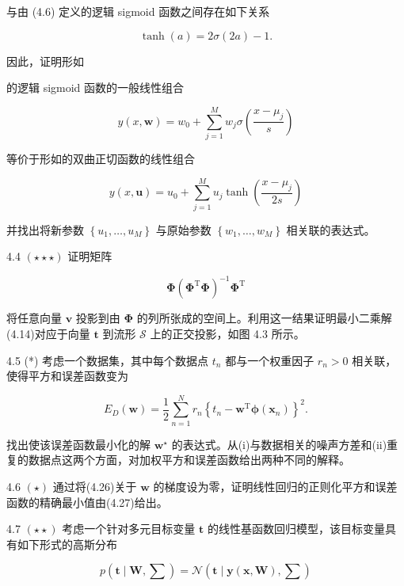 \documentclass[10pt]{article}
\begin{document}
与由 (4.6) 定义的逻辑 sigmoid 函数之间存在如下关系

\[
\tanh \left( a\right)  = {2\sigma }\left( {2a}\right)  - 1. \tag{4.56}
\]

因此，证明形如

的逻辑 sigmoid 函数的一般线性组合

\[
y\left( {x,\mathbf{w}}\right)  = {w}_{0} + \mathop{\sum }\limits_{{j = 1}}^{M}{w}_{j}\sigma \left( \frac{x - {\mu }_{j}}{s}\right)  \tag{4.57}
\]

等价于形如的双曲正切函数的线性组合

\[
y\left( {x,\mathbf{u}}\right)  = {u}_{0} + \mathop{\sum }\limits_{{j = 1}}^{M}{u}_{j}\tanh \left( \frac{x - {\mu }_{j}}{2s}\right)  \tag{4.58}
\]

并找出将新参数 \(\left\{  {{u}_{1},\ldots ,{u}_{M}}\right\}\) 与原始参数 \(\left\{  {{w}_{1},\ldots ,{w}_{M}}\right\}\) 相关联的表达式。

4.4 \(\left( {\star  \star   \star  }\right)\) 证明矩阵

\[
\mathbf{\Phi }{\left( {\mathbf{\Phi }}^{\mathrm{T}}\mathbf{\Phi }\right) }^{-1}{\mathbf{\Phi }}^{\mathrm{T}} \tag{4.59}
\]

将任意向量 \(\mathbf{v}\) 投影到由 \(\mathbf{\Phi }\) 的列所张成的空间上。利用这一结果证明最小二乘解(4.14)对应于向量 \(\mathbf{t}\) 到流形 \(\mathcal{S}\) 上的正交投影，如图 4.3 所示。

4.5 (*) 考虑一个数据集，其中每个数据点 \({t}_{n}\) 都与一个权重因子 \({r}_{n} > 0\) 相关联，使得平方和误差函数变为

\[
{E}_{D}\left( \mathbf{w}\right)  = \frac{1}{2}\mathop{\sum }\limits_{{n = 1}}^{N}{r}_{n}{\left\{  {t}_{n} - {\mathbf{w}}^{\mathrm{T}}\mathbf{\phi }\left( {\mathbf{x}}_{n}\right) \right\}  }^{2}. \tag{4.60}
\]

找出使该误差函数最小化的解 \({\mathbf{w}}^{ \star  }\) 的表达式。从(i)与数据相关的噪声方差和(ii)重复的数据点这两个方面，对加权平方和误差函数给出两种不同的解释。

4.6 \(\left( \star \right)\) 通过将(4.26)关于 \(\mathbf{w}\) 的梯度设为零，证明线性回归的正则化平方和误差函数的精确最小值由(4.27)给出。

4.7 \(\left( {\star  \star  }\right)\) 考虑一个针对多元目标变量 \(\mathbf{t}\) 的线性基函数回归模型，该目标变量具有如下形式的高斯分布

\[
p\left( {\mathbf{t} \mid  \mathbf{W},\mathbf{\sum }}\right)  = \mathcal{N}\left( {\mathbf{t} \mid  \mathbf{y}\left( {\mathbf{x},\mathbf{W}}\right) ,\mathbf{\sum }}\right)  \tag{4.61}
\]
\end{document}
